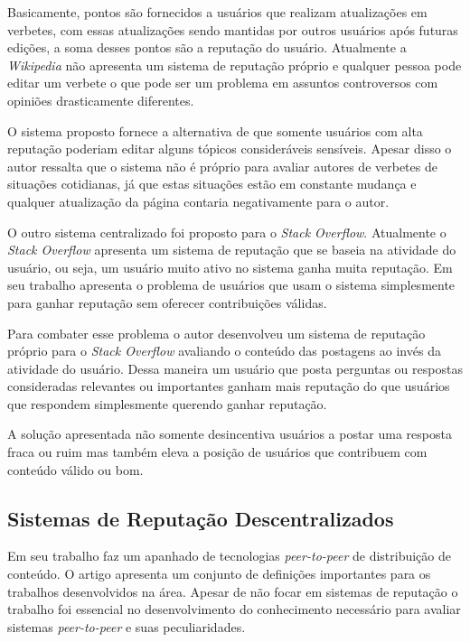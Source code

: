 \documentclass[12pt]{article}
\newcommand{\PtoP} {\emph{peer-to-peer}\xspace}
\begin{document}
Basicamente, pontos são fornecidos a usuários que realizam atualizações em verbetes, com essas atualizações sendo  mantidas por outros usuários após futuras edições, a soma desses pontos são a reputação do usuário. Atualmente a \emph{Wikipedia} não apresenta um sistema de reputação próprio e qualquer pessoa pode editar um verbete o que pode ser um problema em assuntos controversos com opiniões drasticamente diferentes.

O sistema proposto fornece a alternativa de que somente usuários com alta reputação poderiam editar alguns tópicos consideráveis sensíveis. Apesar disso o autor ressalta que o sistema não é próprio para avaliar autores de verbetes de situações cotidianas, já que estas situações estão em constante mudança e qualquer atualização da página contaria negativamente para o autor.

O outro sistema centralizado foi proposto para o \emph{Stack Overflow}. Atualmente o \emph{Stack Overflow} apresenta um sistema de reputação que se baseia na atividade do usuário, ou seja, um usuário muito ativo no sistema ganha muita reputação. Em seu trabalho \cite{huna2016exploiting} apresenta o problema de usuários que usam o sistema simplesmente para ganhar reputação sem oferecer contribuições válidas.

Para combater esse problema o autor desenvolveu um sistema de reputação próprio para o \emph{Stack Overflow} avaliando o conteúdo das postagens ao invés da atividade do usuário. Dessa maneira um usuário que posta perguntas ou respostas consideradas relevantes ou importantes ganham mais reputação do que usuários que respondem simplesmente querendo ganhar reputação.

A solução apresentada não somente desincentiva usuários a postar uma resposta fraca ou ruim mas também eleva a posição de usuários que contribuem com conteúdo válido ou bom.

\subsection{Sistemas de Reputação Descentralizados} \label{subsec:SRDescen}

Em seu trabalho \cite{10.1145/1041680.1041681} faz um apanhado de tecnologias \PtoP de distribuição de conteúdo. O artigo apresenta um conjunto de definições importantes para os trabalhos desenvolvidos na área. Apesar de não focar em sistemas de reputação o trabalho foi essencial no desenvolvimento do conhecimento necessário para avaliar sistemas \PtoP e suas peculiaridades.
\end{document}
